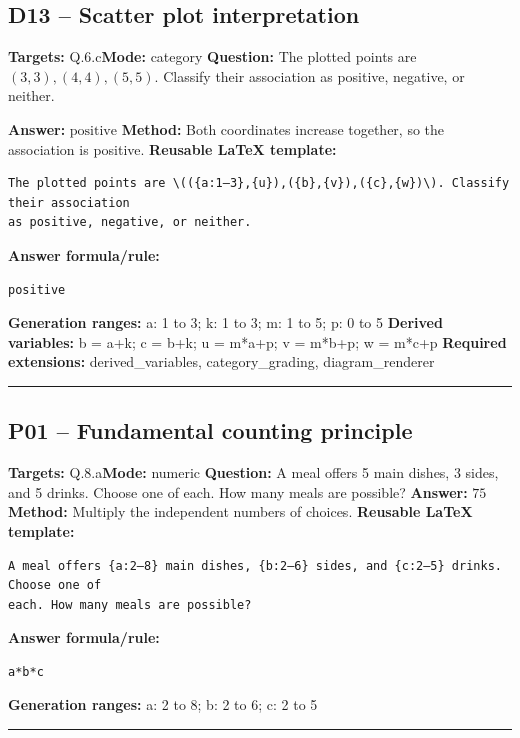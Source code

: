 \documentclass[11pt]{article}
\begin{document}
\subsection{D13 -- Scatter plot interpretation}
\textbf{Targets:} Q.6.c\quad\textbf{Mode:} category
\textbf{Question:} The plotted points are \((3,3),(4,4),(5,5)\). Classify their association as positive, negative, or neither.
\begin{center}\end{center}
\textbf{Answer:} \(\text{positive}\)
\textbf{Method:} Both coordinates increase together, so the association is positive.
\textbf{Reusable LaTeX template:}
\begin{verbatim}
The plotted points are \(({a:1–3},{u}),({b},{v}),({c},{w})\). Classify their association
as positive, negative, or neither.
\end{verbatim}
\textbf{Answer formula/rule:}
\begin{verbatim}
positive
\end{verbatim}
\textbf{Generation ranges:} a: 1 to 3; k: 1 to 3; m: 1 to 5; p: 0 to 5
\textbf{Derived variables:} b = a+k; c = b+k; u = m*a+p; v = m*b+p; w = m*c+p
\textbf{Required extensions:} derived\_variables, category\_grading, diagram\_renderer
\medskip\hrule\medskip
\subsection{P01 -- Fundamental counting principle}
\textbf{Targets:} Q.8.a\quad\textbf{Mode:} numeric
\textbf{Question:} A meal offers 5 main dishes, 3 sides, and 5 drinks. Choose one of each. How many meals are possible?
\textbf{Answer:} \(75\)
\textbf{Method:} Multiply the independent numbers of choices.
\textbf{Reusable LaTeX template:}
\begin{verbatim}
A meal offers {a:2–8} main dishes, {b:2–6} sides, and {c:2–5} drinks. Choose one of
each. How many meals are possible?
\end{verbatim}
\textbf{Answer formula/rule:}
\begin{verbatim}
a*b*c
\end{verbatim}
\textbf{Generation ranges:} a: 2 to 8; b: 2 to 6; c: 2 to 5
\medskip\hrule\medskip
\end{document}

